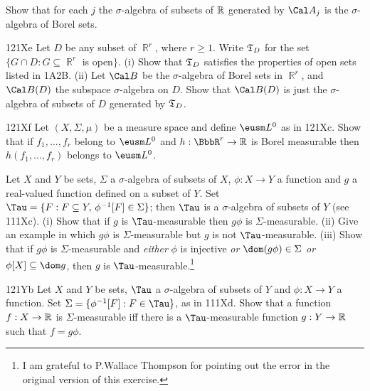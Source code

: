 {
     
     
\noindent Show that for each $j$ the $\sigma$-algebra of subsets of
$\Bbb R$ generated by $\Cal A_j$ is the $\sigma$-algebra of Borel sets.
     
\spheader 121Xe Let $D$ be any subset of $\BbbR^r$, where $r\ge 1$.
Write $\frak T_D$ for the set $\{G\cap D:G\subseteq\BbbR^r$ is
open$\}$.  (i) Show that $\frak T_D$ satisfies the properties of open
sets listed in 1A2B.   (ii) Let $\Cal B$ be the 
$\sigma$-algebra of Borel sets
in $\BbbR^r$, and $\Cal B(D)$ the subspace $\sigma$-algebra on $D$.
Show that $\Cal B(D)$ is just the $\sigma$-algebra of subsets of $D$
generated by $\frak T_D$.   
     
\spheader 121Xf Let $(X,\Sigma,\mu)$ be a measure space and
define $\eusm L^0$ as in 121Xc.   Show that if $f_1,\ldots,f_r$ belong
to $\eusm L^0$ and $h:\BbbR^r\to\Bbb R$ is Borel measurable then
$h(f_1,\ldots,f_r)$ belongs to $\eusm L^0$.
     
Let $X$ and $Y$ be sets, $\Sigma$ a $\sigma$-algebra of subsets of
$X$, $\phi:X\to Y$ a function and $g$ a real-valued function defined on a
subset of $Y$.   Set
$\Tau=\{F:F\subseteq Y,\,\phi^{-1}[F]\in\Sigma\}$;   then $\Tau$ is a
$\sigma$-algebra of subsets of $Y$ (see 111Xc).   (i) Show that if $g$ is
$\Tau$-measurable then $g\phi$ is $\Sigma$-measurable.   
(ii) Give an example in which $g\phi$ is
$\Sigma$-measurable but $g$ is not $\Tau$-measurable.
(iii) Show that if
$g\phi$ is $\Sigma$-measurable and {\it either} $\phi$ is injective 
{\it or} $\dom(g\phi)\in\Sigma$ {\it or} $\phi[X]\subseteq\dom g$, 
then $g$ is $\Tau$-measurable.\footnote{I am grateful to P.Wallace Thompson
for pointing out the error in the original version of this exercise.}   
     
\spheader 121Yb Let $X$ and $Y$ be sets, $\Tau$ a
$\sigma$-algebra of subsets of $Y$ and $\phi:X\to Y$ a function.   Set
$\Sigma=\{\phi^{-1}[F]:F\in\Tau\}$, as in 111Xd.   Show that a
function $f:X\to\Bbb R$ is $\Sigma$-measurable iff there is a
$\Tau$-measurable function $g:Y\to\Bbb R$ such that $f=g\phi$.
     
}
